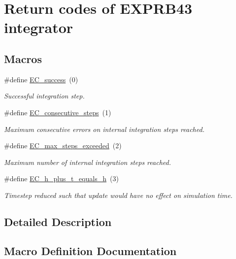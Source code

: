 \hypertarget{group__exprb43__ErrCodes}{}\section{Return codes of E\+X\+P\+R\+B43 integrator}
\label{group__exprb43__ErrCodes}
\subsection*{Macros}
\begin{DoxyCompactItemize}
\item 
\#define \hyperlink{group__exprb43__ErrCodes_gabd83bc0f9f475a2189a4db4a08b790ca}{E\+C\+\_\+success}~(0)
\begin{DoxyCompactList}\small\item\em Successful integration step. \end{DoxyCompactList}\item 
\#define \hyperlink{group__exprb43__ErrCodes_gae0287841c08f86f5709660fd731615ad}{E\+C\+\_\+consecutive\+\_\+steps}~(1)
\begin{DoxyCompactList}\small\item\em Maximum consecutive errors on internal integration steps reached. \end{DoxyCompactList}\item 
\#define \hyperlink{group__exprb43__ErrCodes_ga0f0275d9851ab5c19b79a963d5084df3}{E\+C\+\_\+max\+\_\+steps\+\_\+exceeded}~(2)
\begin{DoxyCompactList}\small\item\em Maximum number of internal integration steps reached. \end{DoxyCompactList}\item 
\#define \hyperlink{group__exprb43__ErrCodes_ga9326efd544880e2683c4453365ca2704}{E\+C\+\_\+h\+\_\+plus\+\_\+t\+\_\+equals\+\_\+h}~(3)
\begin{DoxyCompactList}\small\item\em Timestep reduced such that update would have no effect on simulation time. \end{DoxyCompactList}\end{DoxyCompactItemize}


\subsection{Detailed Description}


\subsection{Macro Definition Documentation}
